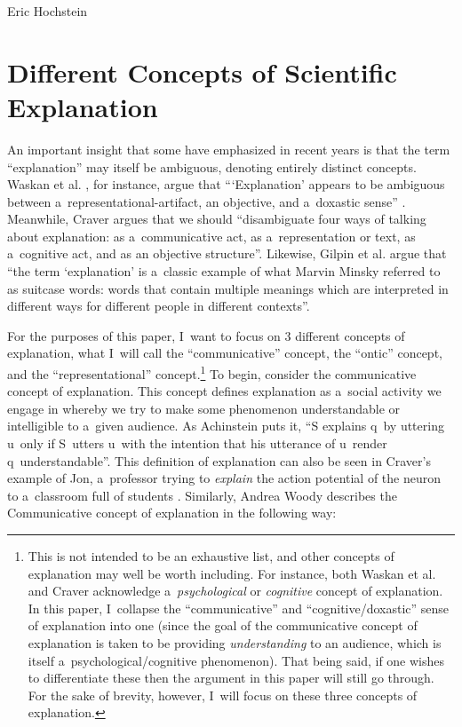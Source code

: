 \begin{artengenv}{Eric Hochstein}
\section{Different Concepts of Scientific Explanation}
An important insight that some have emphasized in recent years is that the term ``explanation'' may itself be ambiguous, denoting entirely distinct concepts. Waskan et al.
\parencite*[][]{izadi_building_2014}, %
 for instance, argue that ``‘Explanation' appears to be ambiguous between a~representational-artifact, an objective, and a~doxastic sense'' 
\parencite[][p.3090]{bello_three_2014}. %
 Meanwhile, Craver 
\parencite*[][p.29]{kaiser_ontic_2014} %
 argues that we should ``disambiguate four ways of talking about explanation: as a~communicative act, as a~representation or text, as a~cognitive act, and as an objective structure''. Likewise, Gilpin et al. 
\parencite*[][p.3]{gilpin_explanation_2022} %
 argue that ``the term ‘explanation' is a~classic example of what Marvin Minsky referred to as suitcase words: words that contain multiple meanings which are interpreted in different ways for different people in different contexts''.

For the purposes of this paper, I~want to focus on 3 different concepts of explanation, what I~will call the ``communicative'' concept, the ``ontic'' concept, and the ``representational'' concept.\footnote{This is not intended to be an exhaustive list, and other concepts of explanation may well be worth including. For instance, both Waskan et al. and Craver acknowledge a~\textit{psychological} or \textit{cognitive} concept of explanation. In this paper, I~collapse the ``communicative'' and ``cognitive/doxastic'' sense of explanation into one (since the goal of the communicative concept of explanation is taken to be providing \textit{understanding} to an audience, which is itself a~psychological/cognitive phenomenon). That being said, if one wishes to differentiate these then the argument in this paper will still go through. For the sake of brevity, however, I~will focus on these three concepts of explanation.} To begin, consider the communicative concept of explanation. This concept defines explanation as a~social activity we engage in whereby we try to make some phenomenon understandable or intelligible to a~given audience. As Achinstein
\parencite*[][pp.16–17]{achinstein_nature_1983} %
 puts it, ``S explains q~by uttering u~only if S~utters u~with the intention that his utterance of u~render q~understandable''. This definition of explanation can also be seen in Craver's example of Jon, a~professor trying to \textit{explain} the action potential of the neuron to a~classroom full of students 
\parencite[][p.30]{kaiser_ontic_2014}. %
 Similarly, Andrea Woody describes the Communicative concept of explanation in the following way:


\end{artengenv}
